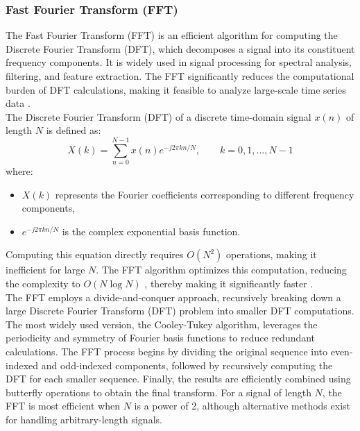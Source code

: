 \subsubsection*{Fast Fourier Transform (FFT)}

The Fast Fourier Transform (FFT) is an efficient algorithm for computing the Discrete Fourier Transform (DFT), which decomposes a signal into its constituent frequency components. It is widely used in signal processing for spectral analysis, filtering, and feature extraction. The FFT significantly reduces the computational burden of DFT calculations, making it feasible to analyze large-scale time series data \parencite{oppenheim1999discrete}. \\

The Discrete Fourier Transform (DFT) of a discrete time-domain signal $x(n)$ of length $N$ is defined as:
\begin{equation}
    X(k) = \sum_{n=0}^{N-1} x(n)e^{-j2\pi kn/N}, \qquad k = 0,1, ..., N-1
\end{equation}
where:
\begin{itemize}
    \item $X(k)$ represents the Fourier coefficients corresponding to different frequency components,
    \item $e^{-j2\pi kn/N}$ is the complex exponential basis function.
\end{itemize}
 
Computing this equation directly requires $O(N^2)$ operations, making it inefficient for large $N$. The FFT algorithm optimizes this computation, reducing the complexity to $O(N \log N)$ , thereby making it significantly faster \parencite{cooley1965algorithm}. \\

The FFT employs a divide-and-conquer approach, recursively breaking down a large Discrete Fourier Transform (DFT) problem into smaller DFT computations. The most widely used version, the Cooley-Tukey algorithm, leverages the periodicity and symmetry of Fourier basis functions to reduce redundant calculations. The FFT process begins by dividing the original sequence into even-indexed and odd-indexed components, followed by recursively computing the DFT for each smaller sequence. Finally, the results are efficiently combined using butterfly operations to obtain the final transform. For a signal of length $N$, the FFT is most efficient when $N$ is a power of 2, although alternative methods exist for handling arbitrary-length signals. \\

